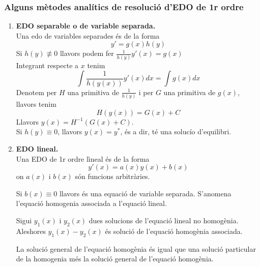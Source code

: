 \documentclass[../main.tex]{subfiles}
\begin{document}
\subsubsection{Alguns mètodes analítics de resolució d'EDO de 1r ordre}
\begin{enumerate}
    \item \textbf{EDO separable o de variable separada.}\\
    Una edo de variables separades és de la forma
    \begin{displaymath}
        y' = g\left(x\right) h\left(y\right)
    \end{displaymath}
    Si $h\left(y\right) \not\equiv 0$ llavors podem fer $\frac{1}{h\left(y\right)} y'\left(x\right) = g\left(x\right)$\\
    Integrant respecte a $x$ tenim
    \begin{displaymath}
        \int \frac{1}{h\left(y(x)\right)} y'(x) dx = \int g(x) dx
    \end{displaymath}
    Denotem per $H$ una primitiva de $\frac{1}{h\left(y\right)}$ i per $G$ una primitiva de $g(x)$,
    llavors tenim
    \begin{displaymath}
        H(y(x)) = G(x) + C
    \end{displaymath}
    Llavors $y(x) = H^{-1}\left(G(x)+C\right)$.\\
    Si $h\left(y\right) \equiv 0$, llavors $y(x) = y^*$, és a dir, té una solucío d'equilibri.
    \item \textbf{EDO lineal.}\\
    Una EDO de 1r ordre lìneal és de la forma
    \begin{displaymath}
        y'(x) = a(x) y(x) + b(x)
    \end{displaymath}
    on $a(x)$ i $b(x)$ són funcions arbitràries.
    \begin{obs}
        Si $b(x) \equiv 0$ llavors és una equació de variable separada. S'anomena l'equació
        homogenia associada a l'equació lineal. 
    \end{obs}
    \begin{proposicio}
        Sigui $y_1(x)$ i $y_2(x)$ dues solucions de l'equació lineal no homogènia. Aleshores $y_1(x)-y_2(x)$
        és solució de l'equació homogènia associada.
    \end{proposicio}
    \begin{corolari}
        La solució general de l'equació homogènia és igual que una solució particular de la
        homogenia més la solució general de l'equació homogènia.

\end{corolari}
\end{enumerate}
\end{document}
